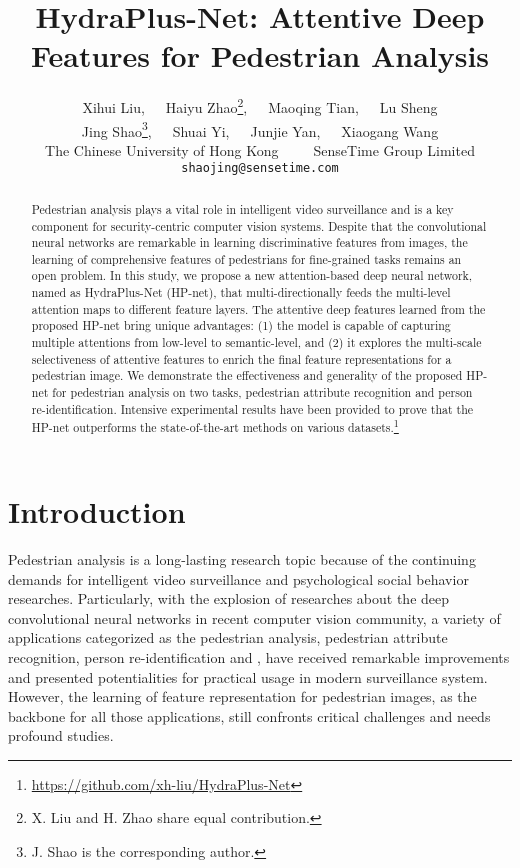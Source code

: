 \documentclass[10pt,twocolumn,letterpaper]{article}
\begin{document}
\title{HydraPlus-Net: Attentive Deep Features for Pedestrian Analysis} 

\author{Xihui Liu,~~~Haiyu Zhao\thanks{X. Liu and H. Zhao share equal contribution.},~~~Maoqing Tian,~~~Lu Sheng\\
\vspace{-10pt}
Jing Shao\thanks{J. Shao is the corresponding author.},~~~Shuai Yi,~~~Junjie Yan,~~~Xiaogang Wang\\
{The Chinese University of Hong Kong~~~~~SenseTime Group Limited}\\
{\tt\small shaojing@sensetime.com}
}


\maketitle



\begin{abstract}
Pedestrian analysis plays a vital role in intelligent video surveillance and is a key component for security-centric computer vision systems.
Despite that the convolutional neural networks are remarkable in learning discriminative features from images, the learning of comprehensive features of pedestrians for fine-grained tasks remains an open problem.
In this study, we propose a new attention-based deep neural network, named as HydraPlus-Net (HP-net), that multi-directionally feeds the multi-level attention maps to different feature layers.
The attentive deep features learned from the proposed HP-net bring unique advantages:
(1) the model is capable of capturing multiple attentions from low-level to semantic-level, and (2) it explores the multi-scale selectiveness of attentive features to enrich the final feature representations for a pedestrian image.
We demonstrate the effectiveness and generality of the proposed HP-net for pedestrian analysis on two tasks, \ie pedestrian attribute recognition and person re-identification.
Intensive experimental results have been provided to prove that the HP-net outperforms the state-of-the-art methods on various datasets.\footnote{\url{https://github.com/xh-liu/HydraPlus-Net}}
\end{abstract}





\section{Introduction}
\label{sec:intro}
Pedestrian analysis is a long-lasting research topic because of the continuing demands for intelligent video surveillance and psychological social behavior researches.
Particularly, with the explosion of researches about the deep convolutional neural networks in recent computer vision community, a variety of applications categorized as the pedestrian analysis, \eg pedestrian attribute recognition, person re-identification and \etc, have received remarkable improvements and presented potentialities for practical usage in modern surveillance system.
However, the learning of feature representation for pedestrian images, as the backbone for all those applications, still confronts critical challenges and needs profound studies.
\end{document}
